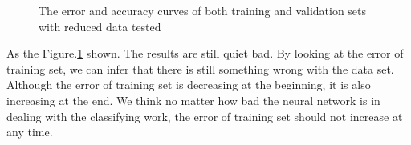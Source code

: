 \documentclass{article}
\begin{document}
\begin{figure}[h]%
\centering
{}%
%
\qquad
{}%
%
\qquad
\caption{The error and accuracy curves of both training and validation sets with reduced data tested}
\label{fig:reduceddata}
\end{figure}

As the Figure.\ref{fig:reduceddata} shown. The results are still quiet bad. By looking at the error of training set, we can infer that there is still something wrong with the data set. Although the error of training set is decreasing at the beginning, it is also increasing at the end. We think no matter how bad the neural network is in dealing with the classifying work, the error of training set should not increase at any time.
\end{document}
